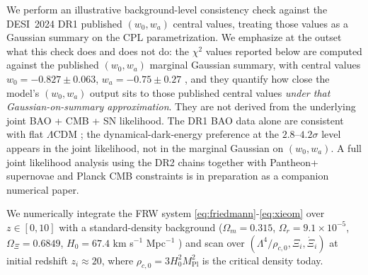 \documentclass[11pt,reqno]{amsart}
\theoremstyle{plain}
\theoremstyle{definition}
\theoremstyle{remark}
\newcommand{\Pl}{\mathrm{Pl}}
\begin{document}
We perform an illustrative background-level consistency check against
the DESI~2024 DR1 published $(w_0, w_a)$ central values, treating those
values as a Gaussian summary on the CPL parametrization. We emphasize at
the outset what this check does and does not do: the
$\chi^{2}$ values reported below are computed against the published
$(w_0, w_a)$ marginal Gaussian summary, with central values
$w_0 = -0.827 \pm 0.063$, $w_a = -0.75 \pm 0.27$ \cite{DESI2024VI}, and
they quantify how close the model's $(w_0, w_a)$ output sits to those
published central values \emph{under that Gaussian-on-summary
approximation}. They are not derived from the underlying joint
BAO + CMB + SN likelihood. The DR1 BAO data alone are consistent with
flat $\Lambda$CDM \cite{DESI2024BAO}; the dynamical-dark-energy
preference at the $2.8$--$4.2\sigma$ level appears in the joint
likelihood, not in the marginal Gaussian on $(w_0, w_a)$. A full joint
likelihood analysis using the DR2 chains \cite{DESI2025DR2} together
with Pantheon+ supernovae and Planck CMB constraints is in preparation
as a companion numerical paper.

We numerically integrate the FRW system
\eqref{eq:friedmann}-\eqref{eq:xieom} over $z \in [0, 10]$ with a
standard-density background ($\Omega_m = 0.315$, $\Omega_r = 9.1\times10^{-5}$,
$\Omega_\Xi = 0.6849$, $H_0 = 67.4$ km s$^{-1}$ Mpc$^{-1}$
\cite{Planck2020}) and scan over $(\Lambda^{4}/\rho_{c,0}, \Xi_i, \dot\Xi_i)$
at initial redshift $z_i \approx 20$, where $\rho_{c,0} = 3 H_0^{2} M_\Pl^{2}$
is the critical density today.
\end{document}
